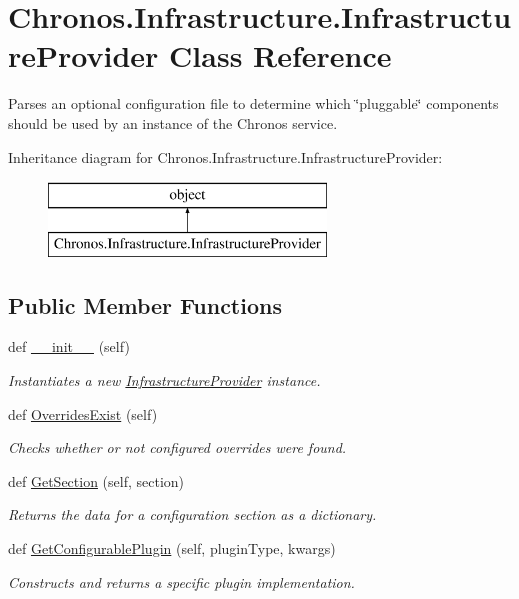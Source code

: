 \hypertarget{classChronos_1_1Infrastructure_1_1InfrastructureProvider}{}\section{Chronos.\+Infrastructure.\+Infrastructure\+Provider Class Reference}
\label{classChronos_1_1Infrastructure_1_1InfrastructureProvider}


Parses an optional configuration file to determine which \char`\"{}pluggable\char`\"{} components should be used by an instance of the Chronos service.  


Inheritance diagram for Chronos.\+Infrastructure.\+Infrastructure\+Provider\+:\begin{figure}[H]
\begin{center}
\leavevmode
\includegraphics[height=2.000000cm]{classChronos_1_1Infrastructure_1_1InfrastructureProvider}
\end{center}
\end{figure}
\subsection*{Public Member Functions}
\begin{DoxyCompactItemize}
\item 
def \hyperlink{group__Chronos_gafcca7af6894603b63cf1340ea78429df}{\+\_\+\+\_\+init\+\_\+\+\_\+} (self)
\begin{DoxyCompactList}\small\item\em Instantiates a new \hyperlink{classChronos_1_1Infrastructure_1_1InfrastructureProvider}{Infrastructure\+Provider} instance. \end{DoxyCompactList}\item 
def \hyperlink{group__Chronos_ga747229914c9f0788c88c3ba985224dcb}{Overrides\+Exist} (self)
\begin{DoxyCompactList}\small\item\em Checks whether or not configured overrides were found. \end{DoxyCompactList}\item 
def \hyperlink{group__Chronos_ga5ff90b1f8833a5d3b527fc0a746e088d}{Get\+Section} (self, section)
\begin{DoxyCompactList}\small\item\em Returns the data for a configuration section as a dictionary. \end{DoxyCompactList}\item 
def \hyperlink{group__Chronos_ga5793a6dd67790fc5c73518eb71ec93ab}{Get\+Configurable\+Plugin} (self, plugin\+Type, kwargs)
\begin{DoxyCompactList}\small\item\em Constructs and returns a specific plugin implementation. \end{DoxyCompactList}\end{DoxyCompactItemize}
